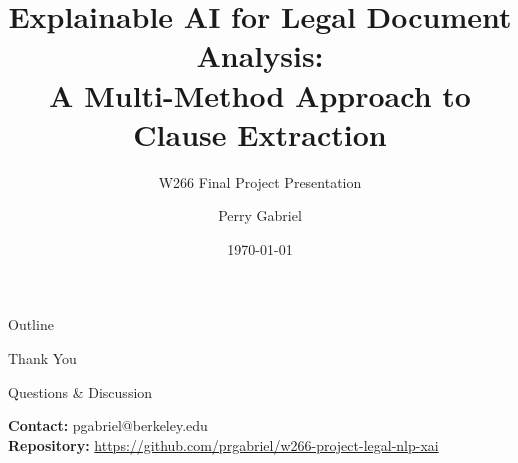 \documentclass[aspectratio=169]{beamer}
\title[Legal NLP Explainability]{Explainable AI for Legal Document Analysis: \\
A Multi-Method Approach to Clause Extraction}
\subtitle{W266 Final Project Presentation}
\author[Gabriel]{Perry Gabriel}
\institute[UC Berkeley]{
  School of Information \\
  University of California, Berkeley
}
\date{\today}
\begin{document}
\frame{\titlepage}

\begin{frame}{Outline}
\tableofcontents
\end{frame}



\begin{frame}[plain]
\centering
\Huge \textcolor{berkeleyblue}{Thank You}
\vspace{1cm}

\Large Questions \& Discussion
\vspace{1cm}

\normalsize
\textbf{Contact:} pgabriel@berkeley.edu \\
\textbf{Repository:} \url{https://github.com/prgabriel/w266-project-legal-nlp-xai}
\end{frame}
\end{document}
